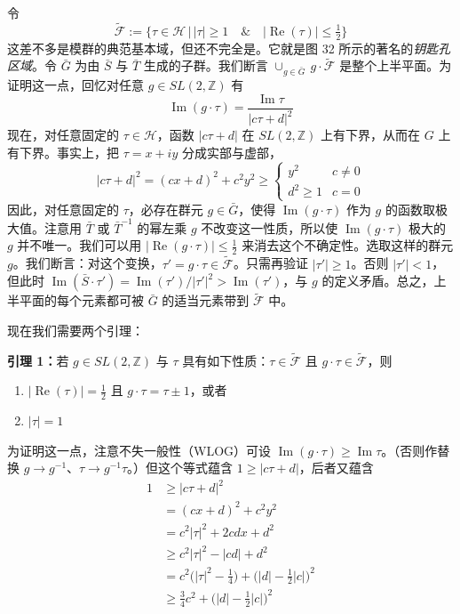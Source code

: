 令
\begin{equation}
  \tilde{\mathcal{F}}:=\{\tau\in\mathcal{H}\,|\,|\tau|\ge1\quad\&\quad|\operatorname{Re}(\tau)|\le\tfrac{1}{2}\}
  \tag{C.5}
  \label{eq:C.5}
\end{equation}
这差不多是模群的典范基本域，但还不完全是。它就是图 32 所示的著名的\emph{钥匙孔区域}。令 $\bar G$ 为由 $\bar S$ 与 $\bar T$ 生成的子群。我们断言 $\cup_{g\in\bar G}\,g\cdot\tilde{\mathcal{F}}$ 是整个上半平面。为证明这一点，回忆对任意 $g\in SL(2,\mathbb{Z})$ 有
\begin{equation}
  \operatorname{Im}(g\cdot\tau)=\frac{\operatorname{Im}\tau}{|c\tau+d|^2}
  \tag{C.6}
  \label{eq:C.6}
\end{equation}
现在，对任意固定的 $\tau\in\mathcal{H}$，函数 $|c\tau+d|$ 在 $SL(2,\mathbb{Z})$ 上有下界，从而在 $G$ 上有下界。事实上，把 $\tau=x+iy$ 分成实部与虚部，
\begin{equation}
  |c\tau+d|^2=(cx+d)^2+c^2y^2\ge
  \begin{cases}
    y^2 & c\ne0\\
    d^2\ge1 & c=0
  \end{cases}
  \tag{C.7}
  \label{eq:C.7}
\end{equation}
因此，对任意固定的 $\tau$，必存在群元 $g\in\bar G$，使得 $\operatorname{Im}(g\cdot\tau)$ 作为 $g$ 的函数取极大值。注意用 $\bar T$ 或 $\bar T^{-1}$ 的幂左乘 $g$ 不改变这一性质，所以使 $\operatorname{Im}(g\cdot\tau)$ 极大的 $g$ 并不唯一。我们可以用 $|\operatorname{Re}(g\cdot\tau)|\le\frac{1}{2}$ 来消去这个不确定性。选取这样的群元 $g$。我们断言：对这个变换，$\tau'=g\cdot\tau\in\tilde{\mathcal{F}}$。只需再验证 $|\tau'|\ge1$。否则 $|\tau'|<1$，但此时 $\operatorname{Im}(\bar S\cdot\tau')=\operatorname{Im}(\tau')/|\tau'|^2>\operatorname{Im}(\tau')$，与 $g$ 的定义矛盾。总之，上半平面的每个元素都可被 $\bar G$ 的适当元素带到 $\tilde{\mathcal{F}}$ 中。

现在我们需要两个引理：

\textbf{引理 1：}若 $g\in SL(2,\mathbb{Z})$ 与 $\tau$ 具有如下性质：$\tau\in\tilde{\mathcal{F}}$ 且 $g\cdot\tau\in\tilde{\mathcal{F}}$，则
\begin{enumerate}
  \item $|\operatorname{Re}(\tau)|=\frac{1}{2}$ 且 $g\cdot\tau=\tau\pm1$，或者
  \item $|\tau|=1$
\end{enumerate}

为证明这一点，注意不失一般性（WLOG）可设 $\operatorname{Im}(g\cdot\tau)\ge\operatorname{Im}\tau$。（否则作替换 $g\to g^{-1}$、$\tau\to g^{-1}\tau$。）但这个等式蕴含 $1\ge|c\tau+d|$，后者又蕴含
\begin{equation}
  \begin{aligned}
    1&\ge|c\tau+d|^2\\
    &=(cx+d)^2+c^2y^2\\
    &=c^2|\tau|^2+2cdx+d^2\\
    &\ge c^2|\tau|^2-|cd|+d^2\\
    &=c^2\Big(|\tau|^2-\frac{1}{4}\Big)+\Big(|d|-\frac{1}{2}|c|\Big)^2\\
    &\ge\frac{3}{4}c^2+\Big(|d|-\frac{1}{2}|c|\Big)^2
  \end{aligned}
  \tag{C.8}
  \label{eq:C.8}
\end{equation}

